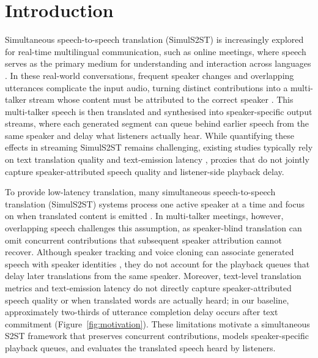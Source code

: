 \section{Introduction}
\label{sec:intro}






Simultaneous speech-to-speech translation (SimulS2ST) is increasingly explored for real-time multilingual communication, such as online meetings, where speech serves as the primary medium for understanding and interaction across languages \citep{seamless2023,labiausse2025hibiki,cheng2025liveinterpret}.
In these real-world conversations, frequent speaker changes and overlapping utterances complicate the input audio, turning distinct contributions into a multi-talker stream whose content must be attributed to the correct speaker \citep{carletta2005ami,yang2024diarist}.
This multi-talker speech is then translated and synthesised into speaker-specific output streams, where each generated segment can queue behind earlier speech from the same speaker and delay what listeners actually hear. While quantifying these effects in streaming SimulS2ST remains challenging, existing studies typically rely on text translation quality and text-emission latency \citep{ma2019stacl,papi2022over}, proxies that do not jointly capture speaker-attributed speech quality and listener-side playback delay.

To provide low-latency translation, many simultaneous speech-to-speech translation (SimulS2ST) systems process one active speaker at a time and focus on when translated content is emitted \citep{seamless2023,labiausse2025hibiki,cheng2025liveinterpret,deng2025simuls2s}.
In multi-talker meetings, however, overlapping speech challenges this assumption, as speaker-blind translation can omit concurrent contributions that subsequent speaker attribution cannot recover.
Although speaker tracking and voice cloning can associate generated speech with speaker identities \citep{zhao2026xtranslator}, they do not account for the playback queues that delay later translations from the same speaker.
Moreover, text-level translation metrics and text-emission latency do not directly capture speaker-attributed speech quality or when translated words are actually heard; in our baseline, approximately two-thirds of utterance completion delay occurs after text commitment (Figure~\ref{fig:motivation}).
These limitations motivate a simultaneous S2ST framework that preserves concurrent contributions, models speaker-specific playback queues, and evaluates the translated speech heard by listeners.


